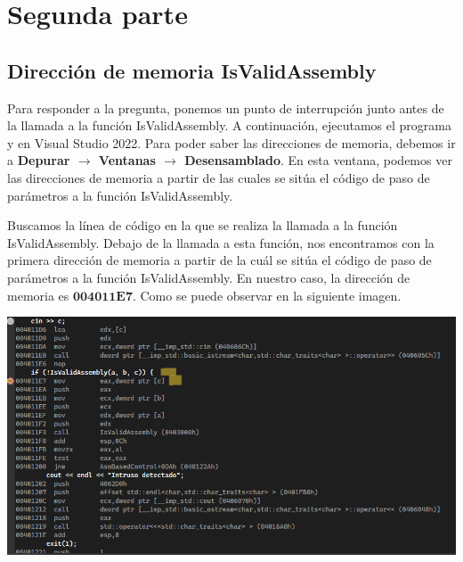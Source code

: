 \documentclass[11pt,a4paper]{article}
\begin{document}
\section{Segunda parte}
\subsection{Dirección de memoria IsValidAssembly}
Para responder a la pregunta, ponemos un punto de interrupción junto antes de la llamada a la
función IsValidAssembly. A continuación, ejecutamos el programa y en Visual Studio 2022. Para poder saber las 
direcciones de memoria, debemos ir a \textbf{Depurar \(\rightarrow\) Ventanas \(\rightarrow\) Desensamblado}. En esta ventana, 
podemos ver las direcciones de memoria a partir de las cuales se sitúa el código de paso de parámetros a la función IsValidAssembly.

\vspace{1ex}
\indent Buscamos la línea de código en la que se realiza la llamada a la función IsValidAssembly. Debajo de la llamada a esta función,
nos encontramos con la primera dirección de memoria a partir de la cuál se sitúa el código de paso de parámetros a la 
función IsValidAssembly. En nuestro caso, la dirección de memoria es \(\mathbf{004011E7}\). Como se puede observar en la siguiente imagen.
\begin{center}
\includegraphics[width=\textwidth]{direccionIsValid.PNG}
\end{center}
\vspace{1ex}
\end{document}
